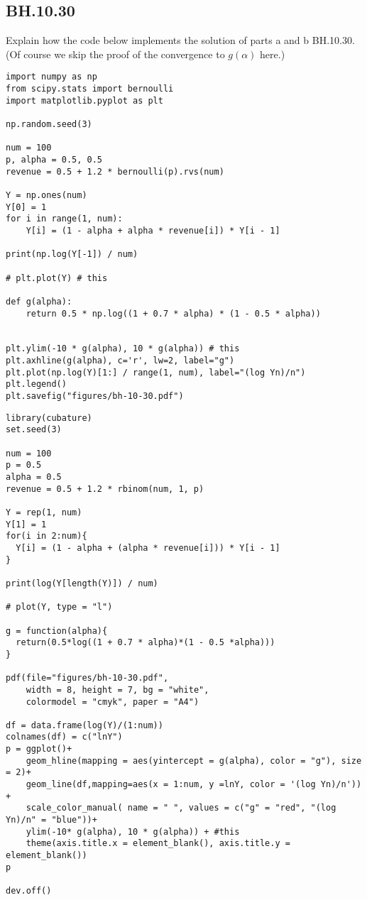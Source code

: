

\subsection{BH.10.30}

\begin{exercise}
Explain how the code below implements the solution of parts a and b BH.10.30. (Of course we skip the proof of the convergence to $g(\alpha)$ here.)
\end{exercise}

\begin{verbatim}
import numpy as np
from scipy.stats import bernoulli
import matplotlib.pyplot as plt

np.random.seed(3)

num = 100
p, alpha = 0.5, 0.5
revenue = 0.5 + 1.2 * bernoulli(p).rvs(num)

Y = np.ones(num)
Y[0] = 1
for i in range(1, num):
    Y[i] = (1 - alpha + alpha * revenue[i]) * Y[i - 1]

print(np.log(Y[-1]) / num)

# plt.plot(Y) # this

def g(alpha):
    return 0.5 * np.log((1 + 0.7 * alpha) * (1 - 0.5 * alpha))


plt.ylim(-10 * g(alpha), 10 * g(alpha)) # this
plt.axhline(g(alpha), c='r', lw=2, label="g")
plt.plot(np.log(Y)[1:] / range(1, num), label="(log Yn)/n")
plt.legend()
plt.savefig("figures/bh-10-30.pdf")
\end{verbatim}

\begin{verbatim}
library(cubature)   
set.seed(3)

num = 100
p = 0.5
alpha = 0.5
revenue = 0.5 + 1.2 * rbinom(num, 1, p)

Y = rep(1, num)
Y[1] = 1
for(i in 2:num){
  Y[i] = (1 - alpha + (alpha * revenue[i])) * Y[i - 1]
}

print(log(Y[length(Y)]) / num)

# plot(Y, type = "l")

g = function(alpha){
  return(0.5*log((1 + 0.7 * alpha)*(1 - 0.5 *alpha)))
}

pdf(file="figures/bh-10-30.pdf",
    width = 8, height = 7, bg = "white",          
    colormodel = "cmyk", paper = "A4")

df = data.frame(log(Y)/(1:num))
colnames(df) = c("lnY")
p = ggplot()+
    geom_hline(mapping = aes(yintercept = g(alpha), color = "g"), size = 2)+
    geom_line(df,mapping=aes(x = 1:num, y =lnY, color = '(log Yn)/n')) +
    scale_color_manual( name = " ", values = c("g" = "red", "(log Yn)/n" = "blue"))+
    ylim(-10* g(alpha), 10 * g(alpha)) + #this
    theme(axis.title.x = element_blank(), axis.title.y = element_blank())
p    

dev.off()
\end{verbatim}


